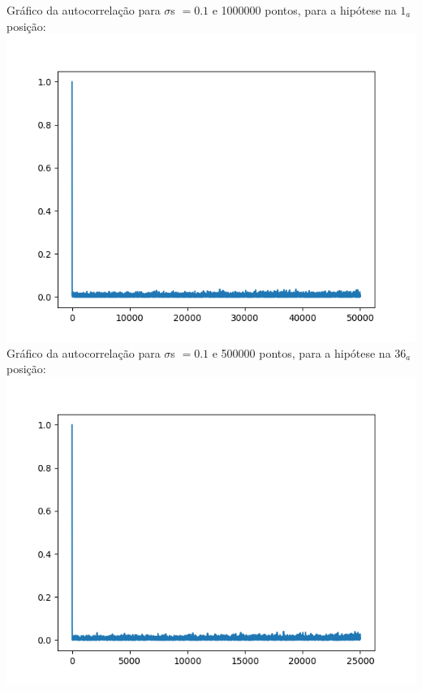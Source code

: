 \documentclass[pt12]{article}
\begin{document}
\begin{center}
Gráfico da autocorrelação para $\sigma$s $= 0.1$ e 1000000 pontos, para a hipótese na $1_a$ posição:\\
\includegraphics[scale=0.5]{Autocorr100000hip1.png}\\
Gráfico da autocorrelação para $\sigma$s $= 0.1$ e 500000 pontos, para a hipótese na $36_a$ posição:\\
\includegraphics[scale=0.5]{Autocorr50000hip36.png}\\

\end{center}
\end{document}
